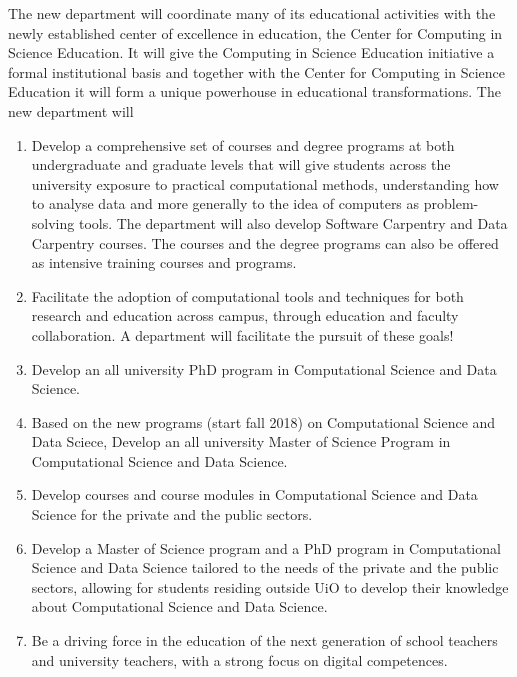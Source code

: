 \documentclass[%
oneside,                 %
final,                   %
10pt]{article}
\begin{document}
The new department will coordinate many of its educational
activities with the newly established center of excellence in
education, the Center for Computing in Science Education. It will give
the Computing in Science Education initiative a formal institutional
basis  and together with the Center for Computing in Science Education it
will form a unique powerhouse in educational transformations. The new
department will

\begin{enumerate}
\item Develop a comprehensive set of courses and degree programs at both undergraduate and graduate levels that will give students across the university exposure to practical computational methods, understanding how to analyse data and more generally to the idea of computers as problem-solving tools. The department will also  develop  Software Carpentry and Data Carpentry courses. The courses and the degree programs can also be offered as intensive training courses and programs.	

\item Facilitate the adoption of computational tools and techniques for both research and education across campus, through education and faculty collaboration. A  department will facilitate the pursuit of these goals!	

\item Develop an all university PhD program in Computational Science and Data Science.

\item Based on the new programs (start fall 2018) on Computational Science and Data Sciece, Develop an all university Master of Science Program in Computational Science and Data Science.

\item Develop courses and course modules in Computational Science and Data Science for the private and the public sectors.

\item Develop a Master of Science program and a PhD program in Computational Science and Data Science tailored to the needs of the private and the public sectors, allowing for students residing outside UiO to develop their knowledge about Computational Science and Data Science.

\item Be a driving force in the education of  the next generation of school teachers and university teachers,  with a strong focus on digital competences. 
\end{enumerate}
\end{document}
